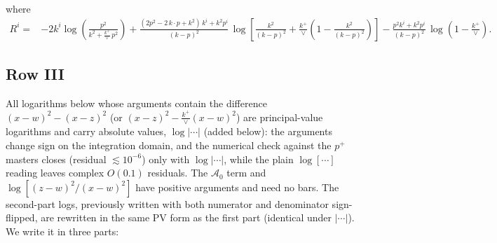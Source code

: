 \documentclass[9pt]{article}
\numberwithin{equation}{section}
\begin{document}
where
\begin{align}
R^{i} =& -2k^{i}\log\left(\frac{p^{2}}{k^{2}+\frac{k^{+}}{\vee}\,p^{2}}\right)
+\frac{(2p^{2}-2\,k\cdot p+k^{2})\,k^{i}+k^{2}p^{i}}{(k-p)^{2}}\,
\log\left[\frac{k^{2}}{(k-p)^{2}}+\frac{k^{+}}{\vee}\left(1-\frac{k^{2}}{(k-p)^{2}}\right)\right]
-\frac{p^{2}k^{i}+k^{2}p^{i}}{(k-p)^{2}}\,\log\left(1-\frac{k^{+}}{\vee}\right).
\end{align}
\subsection{Row III}
{\color{red}All logarithms below whose arguments contain the difference $(x-w)^{2}-(x-z)^{2}$
(or $(x-z)^{2}-\frac{k^{+}}{\vee}(x-w)^{2}$) are principal-value logarithms and carry absolute
values, $\log|\cdots|$ (added below): the arguments change sign on the integration domain, and
the numerical check against the $p^{+}$ masters closes (residual $\lesssim10^{-6}$) only with
$\log|\cdots|$, while the plain $\log[\cdots]$ reading leaves complex $O(0.1)$ residuals. The
$\mathcal A_{0}$ term and $\log[(z-w)^{2}/(x-w)^{2}]$ have positive arguments and need no bars.
The second-part logs, previously written with both numerator and denominator sign-flipped, are
rewritten in the same PV form as the first part (identical under $|\cdots|$).}
We write it in three parts:
\end{document}
